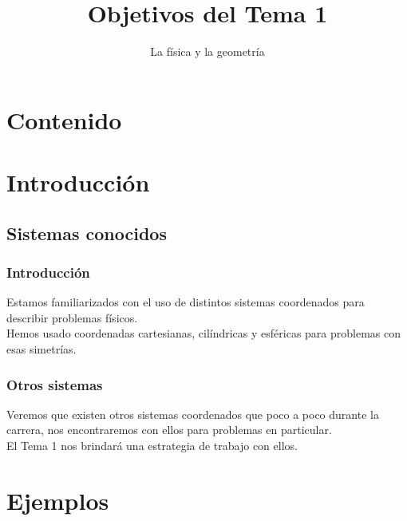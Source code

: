 \documentclass[12pt]{beamer}
\title{Objetivos del Tema 1}
\subtitle{La física y la geometría}
\begin{document}
\maketitle
\fontsize{14}{14}\selectfont
{}
\section*{Contenido}
\section{Introducción}
\subsection{Sistemas conocidos}
\begin{frame}
\frametitle{Introducción}
Estamos familiarizados con el uso de distintos sistemas coordenados para describir problemas físicos.
\\
\bigskip
Hemos usado coordenadas cartesianas, cilíndricas y esféricas para problemas con esas simetrías.
\end{frame}
\begin{frame}
\frametitle{Otros sistemas}
Veremos que existen otros sistemas coordenados que poco a poco durante la carrera, nos encontraremos con ellos para problemas en particular.
\\
\bigskip
\pause
El Tema 1 nos brindará una estrategia de trabajo con ellos.
\end{frame}
\section{Ejemplos}
\end{document}
